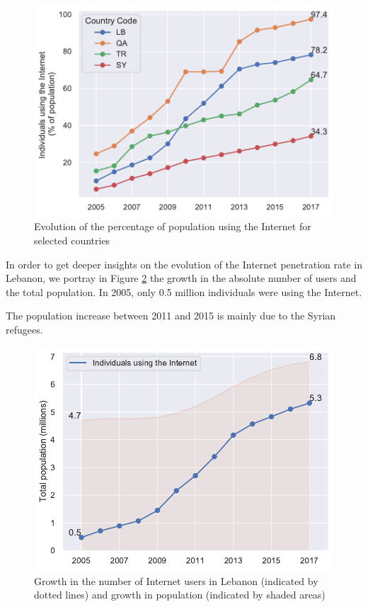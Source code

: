 \documentclass[a4paper,titlepage]{article}
\begin{document}
\begin{figure}
    \centering
    \includegraphics[width=0.75\linewidth]{../output/internet-users.pdf}
    \caption{Evolution of the percentage of population using the Internet for selected countries}
    \label{fig:perc-internet-users-evo}
\end{figure}

In order to get deeper insights on the evolution of the Internet penetration rate in Lebanon, we portray in Figure \ref{fig:population-internet-lb} the growth in the absolute number of users and the total population. In 2005, only 0.5 million individuals were using the Internet.

The population increase between 2011 and 2015 is mainly due to the Syrian refugees.   

\begin{figure}[!h]
    \centering
    \includegraphics[width=0.75\linewidth]{../output/population-internet-lbn.pdf}
    \caption{Growth in the number of Internet users in Lebanon (indicated by dotted lines) and growth in population (indicated by shaded areas)}
    \label{fig:population-internet-lb}
\end{figure}
\end{document}
